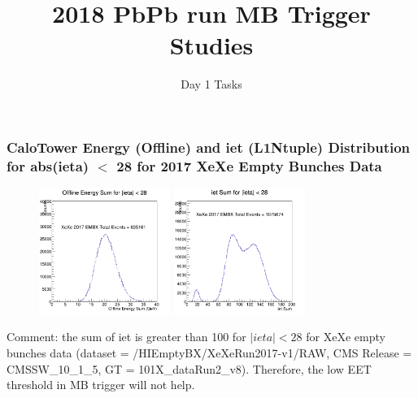 \documentclass{beamer}
\begin{document}
\title{2018 PbPb run MB Trigger Studies}
\subtitle{Day 1 Tasks}

\begin{frame}
\frametitle{CaloTower Energy (Offline) and iet (L1Ntuple) Distribution for abs(ieta) $<$ 28 for 2017 XeXe Empty Bunches Data} 


\begin{figure}
\includegraphics[width=0.38\textwidth]{Plots/XeXe/EnergySumHis28.png}
\includegraphics[width=0.38\textwidth]{Plots/XeXe/iETSumHisLT28.png}
\end{figure}

\begin{block}
{Comment: the sum of iet is greater than 100 for $|ieta| < 28$ for XeXe empty bunches data (dataset = /HIEmptyBX/XeXeRun2017-v1/RAW, CMS Release = CMSSW\_10\_1\_5, GT = 101X\_dataRun2\_v8). Therefore, the low EET threshold in MB trigger will not help.}
\end{block}

\end{frame}
\end{document}
